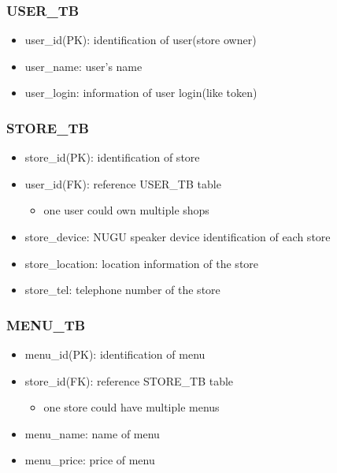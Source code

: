 \documentclass[conference,compsoc]{IEEEtran}
\begin{document}
\subsubsection{USER\_TB}
\begin{itemize}
  \item user\_id(PK): identification of user(store owner)
  \item user\_name: user's name
  \item user\_login: information of user login(like token)
\end{itemize}

\subsubsection{STORE\_TB}
\begin{itemize}
  \item store\_id(PK): identification of store
  \item user\_id(FK): reference USER\_TB table
  \begin{itemize}
    \item one user could own multiple shops
  \end{itemize}
  \item store\_device: NUGU speaker device identification of each store
  \item store\_location: location information of the store
  \item store\_tel: telephone number of the store
\end{itemize}

\subsubsection{MENU\_TB}
\begin{itemize}
  \item menu\_id(PK): identification of menu
  \item store\_id(FK): reference STORE\_TB table
  \begin{itemize}
    \item one store could have multiple menus
  \end{itemize}
  \item menu\_name: name of menu
  \item menu\_price: price of menu
\end{itemize}
\end{document}
